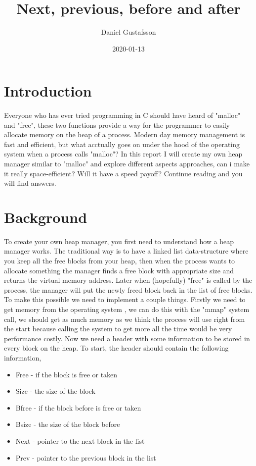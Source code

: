 \documentclass[11pt]{article}
\title{Next, previous, before and after}
\date{2020-01-13}
\author{Daniel Gustafsson}
\begin{document}
\maketitle
{}

\newpage
{}

\section{Introduction}

\paragraph{}
Everyone who has ever tried programming in C should have heard of "malloc" and "free", these two functions provide a way for the programmer to easily
allocate memory on the heap of a process. Modern day memory management is fast and efficient, but what acctually goes on under the hood of the
operating system when a process calls "malloc"? In this report I will create my own heap manager similar to "malloc" and explore different aspects 
approaches, can i make it really space-efficient? Will it have a speed payoff? Continue reading and you will find answers.

\section{Background}

\paragraph{}
To create your own heap manager, you first need to understand how a heap manager works. The traditional way is to have a linked list data-structure 
where you keep all the free blocks from your heap, then when the process wants to allocate something the manager finds a free block with appropriate
size and returns the virtual memory address. Later when (hopefully) "free" is called by the process, the manager will put the newly freed block 
back in the list of free blocks. To make this possible we need to implement a couple things. Firstly we need to get memory from the operating system
, we can do this with the "mmap" system call, we should get as much memory as we think the process will use right from the start because 
calling the system to get more all the time would be very performance costly. Now we need a header with some information to be stored in every block
on the heap. To start, the header should contain the following information,
\begin{itemize}
    \item Free - if the block is free or taken
    \item Size - the size of the block
    \item Bfree - if the block before is free or taken
    \item Bsize - the size of the block before
    \item Next - pointer to the next block in the list
    \item Prev - pointer to the previous block in the list
\end{itemize}
\end{document}
